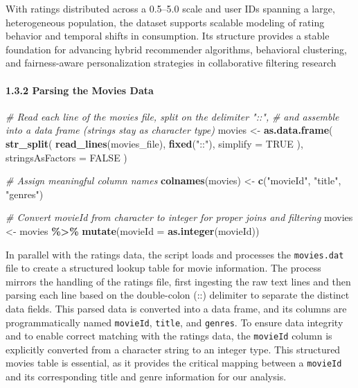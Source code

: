 \documentclass[
]{article}
\newenvironment{Shaded}{\begin{snugshade}}{\end{snugshade}}
\newcommand{\AttributeTok}[1]{\textcolor[rgb]{0.13,0.29,0.53}{#1}}
\newcommand{\CommentTok}[1]{\textcolor[rgb]{0.56,0.35,0.01}{\textit{#1}}}
\newcommand{\ConstantTok}[1]{\textcolor[rgb]{0.56,0.35,0.01}{#1}}
\newcommand{\FunctionTok}[1]{\textcolor[rgb]{0.13,0.29,0.53}{\textbf{#1}}}
\newcommand{\NormalTok}[1]{#1}
\newcommand{\OtherTok}[1]{\textcolor[rgb]{0.56,0.35,0.01}{#1}}
\newcommand{\SpecialCharTok}[1]{\textcolor[rgb]{0.81,0.36,0.00}{\textbf{#1}}}
\newcommand{\StringTok}[1]{\textcolor[rgb]{0.31,0.60,0.02}{#1}}
\begin{document}
With ratings distributed across a 0.5--5.0 scale and user IDs spanning a
large, heterogeneous population, the dataset supports scalable modeling
of rating behavior and temporal shifts in consumption. Its structure
provides a stable foundation for advancing hybrid recommender
algorithms, behavioral clustering, and fairness-aware personalization
strategies in collaborative filtering research

\paragraph{1.3.2 Parsing the Movies Data}\label{parsing-the-movies-data}

\begin{Shaded}
\begin{Highlighting}[]
\CommentTok{\# Read each line of the movies file, split on the delimiter "::", }
\CommentTok{\# and assemble into a data frame (strings stay as character type)}
\NormalTok{movies }\OtherTok{\textless{}{-}} \FunctionTok{as.data.frame}\NormalTok{(}
  \FunctionTok{str\_split}\NormalTok{(}
    \FunctionTok{read\_lines}\NormalTok{(movies\_file), }
    \FunctionTok{fixed}\NormalTok{(}\StringTok{"::"}\NormalTok{), }
    \AttributeTok{simplify =} \ConstantTok{TRUE}
\NormalTok{  ), }
  \AttributeTok{stringsAsFactors =} \ConstantTok{FALSE}
\NormalTok{)}

\CommentTok{\# Assign meaningful column names}
\FunctionTok{colnames}\NormalTok{(movies) }\OtherTok{\textless{}{-}} \FunctionTok{c}\NormalTok{(}\StringTok{"movieId"}\NormalTok{, }\StringTok{"title"}\NormalTok{, }\StringTok{"genres"}\NormalTok{)}

\CommentTok{\# Convert movieId from character to integer for proper joins and filtering}
\NormalTok{movies }\OtherTok{\textless{}{-}}\NormalTok{ movies }\SpecialCharTok{\%\textgreater{}\%} 
  \FunctionTok{mutate}\NormalTok{(}\AttributeTok{movieId =} \FunctionTok{as.integer}\NormalTok{(movieId))}
\end{Highlighting}
\end{Shaded}

In parallel with the ratings data, the script loads and processes the
\texttt{movies.dat} file to create a structured lookup table for movie
information. The process mirrors the handling of the ratings file, first
ingesting the raw text lines and then parsing each line based on the
double-colon (::) delimiter to separate the distinct data fields. This
parsed data is converted into a data frame, and its columns are
programmatically named \texttt{movieId}, \texttt{title}, and
\texttt{genres}. To ensure data integrity and to enable correct matching
with the ratings data, the \texttt{movieId} column is explicitly
converted from a character string to an integer type. This structured
movies table is essential, as it provides the critical mapping between a
\texttt{movieId} and its corresponding title and genre information for
our analysis.
\end{document}
